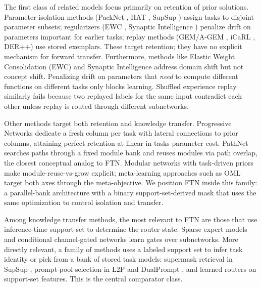 \documentclass[11pt]{article}
\begin{document}
The first class of related models focus primarily on retention of prior solutions. Parameter-isolation methods (PackNet \citep{mallya2018packnet}, HAT \citep{serra2018overcoming}, SupSup \citep{wortsman2020supermasks}) assign tasks to disjoint parameter subsets; regularizers (EWC \citep{kirkpatrick2017overcoming}, Synaptic Intelligence \citep{zenke2017continual}) penalize drift on parameters important for earlier tasks; replay methods (GEM/A-GEM \citep{lopez2017gradient,chaudhry2018efficient}, iCaRL \citep{rebuffi2017icarl}, DER++) use stored exemplars. These target retention; they have no explicit mechanism for forward transfer.
Furthermore, methods like Elastic Weight Consolidation (EWC) and Synaptic Intelligence \citep{kirkpatrick2017overcoming,zenke2017continual} address domain shift but not concept shift. 
Penalizing drift on parameters that \emph{need} to compute different functions on different tasks only blocks learning. 
Shuffled experience replay similarly fails because two replayed labels for the same input contradict each other unless replay is routed through different subnetworks.

Other methods target both retention and knowledge transfer. 
Progressive Networks \citep{rusu2016progressive} dedicate a fresh column per task with lateral connections to prior columns, attaining perfect retention at linear-in-tasks parameter cost. PathNet \citep{fernando2017pathnet} searches paths through a fixed module bank and reuses modules via path overlap, the closest conceptual analog to FTN. Modular networks with task-driven priors \citep{veniat2021mntdp} make module-reuse-vs-grow explicit; meta-learning approaches such as OML \citep{javed2019oml} target both axes through the meta-objective. We position FTN inside this family: a parallel-bank architecture with a binary support-set-derived mask that uses the same optimization to control isolation and transfer.

Among knowledge transfer methods, the most relevant to FTN are those that use inference-time support-set to determine the router state. 
Sparse expert models \citep{shazeer2017outrageously,fedus2022switch} and conditional channel-gated networks \citep{abati2020conditional} learn gates over subnetworks. More directly relevant, a family of methods uses a labeled support set to infer task identity or pick from a bank of stored task models: supermask retrieval in SupSup \citep{wortsman2020supermasks}, prompt-pool selection in L2P and DualPrompt \citep{wang2022learning,wang2022dualprompt}, and learned routers on support-set features. This is the central comparator class.
\end{document}
